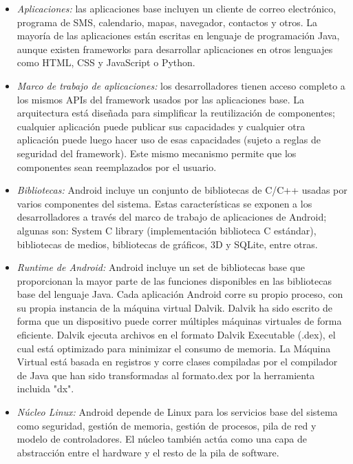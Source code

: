 \begin{itemize}
    \item \emph{Aplicaciones:} las aplicaciones base incluyen un cliente de correo electrónico, programa de SMS, calendario, mapas, navegador, contactos y otros. La mayoría de las aplicaciones están escritas en lenguaje de programación \gls{Java}, aunque existen \gls{framework}s para desarrollar aplicaciones en otros lenguajes como \gls{HTML}, \gls{CSS} y \gls{JavaScript} o \gls{Python}.
    \item \emph{Marco de trabajo de aplicaciones:} los desarrolladores tienen acceso completo a los mismos APIs del framework usados por las aplicaciones base. La arquitectura está diseñada para simplificar la reutilización de componentes; cualquier aplicación puede publicar sus capacidades y cualquier otra aplicación puede luego hacer uso de esas capacidades (sujeto a reglas de seguridad del framework). Este mismo mecanismo permite que los componentes sean reemplazados por el usuario.
    \item \emph{Bibliotecas:} Android incluye un conjunto de bibliotecas de C/C++ usadas por varios componentes del sistema. Estas características se exponen a los desarrolladores a través del marco de trabajo de aplicaciones de Android; algunas son: System C library (implementación biblioteca C estándar), bibliotecas de medios, bibliotecas de gráficos, 3D y SQLite, entre otras.
    \item \emph{Runtime de Android:} Android incluye un set de bibliotecas base que proporcionan la mayor parte de las funciones disponibles en las bibliotecas base del lenguaje Java. Cada aplicación Android corre su propio proceso, con su propia instancia de la máquina virtual Dalvik. Dalvik ha sido escrito de forma que un dispositivo puede correr múltiples máquinas virtuales de forma eficiente. Dalvik ejecuta archivos en el formato Dalvik Executable (.dex), el cual está optimizado para minimizar el consumo de memoria. La Máquina Virtual está basada en registros y corre clases compiladas por el compilador de Java que han sido transformadas al formato.dex por la herramienta incluida "dx".
    
    \item \emph{Núcleo \gls{Linux}:} Android depende de Linux para los servicios base del sistema como seguridad, gestión de memoria, gestión de procesos, pila de red y modelo de controladores. El núcleo también actúa como una capa de abstracción entre el hardware y el resto de la pila de software.
   
 \end{itemize}

